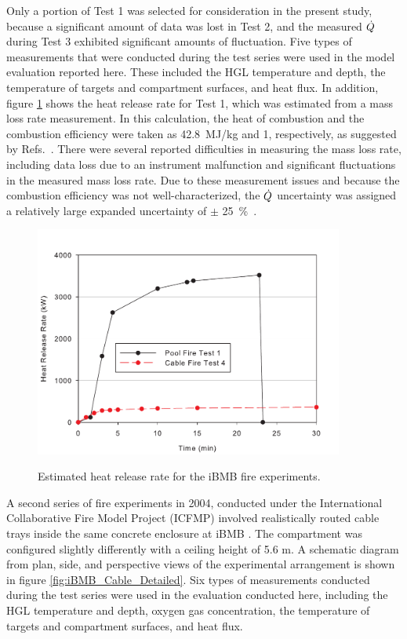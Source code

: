  Only a portion of Test 1 was selected for consideration in the present study, because a significant amount of data was lost in Test 2, and the measured ${\dot{Q}}$  during Test 3 exhibited significant amounts of fluctuation. Five types of measurements that were conducted during the test series were used in the model evaluation reported here.  These included the HGL temperature and depth, the temperature of targets and compartment surfaces, and heat flux. In addition, figure \ref{fig:iBMB_HRR} shows the heat release rate for Test 1, which was estimated from a mass loss rate measurement.  In this calculation, the heat of combustion and the combustion efficiency were taken as 42.8~MJ/kg and 1, respectively, as suggested by Refs.~\cite{NRCNUREG1824, Riese:2004}.  There were several reported difficulties in measuring the mass loss rate, including data loss due to an instrument malfunction and significant fluctuations in the measured mass loss rate. Due to these measurement issues and because the combustion efficiency was not well-characterized, the ${\dot{Q}}$ uncertainty was assigned a relatively large expanded uncertainty of $\pm$ 25~\%~\cite{NRCNUREG1824}.

 \begin{figure}
\begin{center}
\includegraphics[width=4.0in]{FIGURES/iBMB/iBMB_HRR}\\
\end{center}
\caption{Estimated heat release rate for the iBMB fire experiments.}
 \label{fig:iBMB_HRR}
\end{figure}

A second series of fire experiments in 2004, conducted under the International Collaborative Fire Model Project (ICFMP) involved realistically routed cable
trays inside the same concrete enclosure at iBMB \cite{Riese:2004}. The compartment was configured slightly differently with a ceiling height of 5.6 m. A schematic diagram from plan, side, and perspective views of the experimental arrangement is shown in figure \ref{fig:iBMB_Cable_Detailed}. Six types of measurements conducted during the test series were used in the evaluation conducted here, including the HGL temperature and depth, oxygen gas concentration, the temperature of targets and compartment surfaces, and heat flux.

